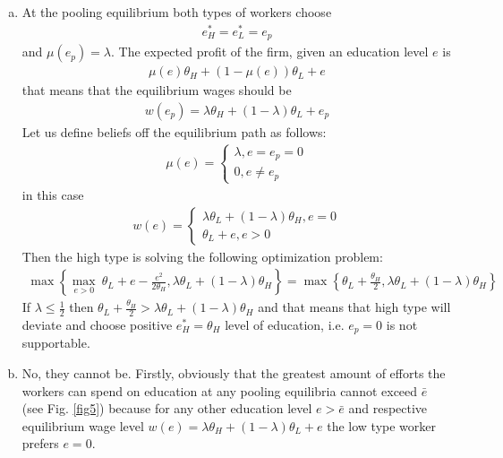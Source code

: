 \documentclass[a4paper]{article}
\begin{document}
\begin{enumerate}
	\begin{enumerate}[(a)]
	\item At the pooling equilibrium both types of workers choose
	\begin{align*}
	e^*_H = e^*_L = e_p
	\end{align*}
	and $\mu(e_p) = \lambda$. The expected profit of the firm, given an education level $e$ is
	\begin{align*}
	\mu(e) \theta_H + (1 - \mu(e)) \theta_L + e
	\end{align*}
	that means that the equilibrium wages should be
	\begin{align*}
	w(e_p) =  \lambda \theta_H + (1 - \lambda) \theta_L + e_p
	\end{align*} 
	Let us define beliefs off the equilibrium path as follows:
	\begin{align*}
	\mu(e) = \begin{cases}
	\lambda, e=e_p = 0\\
	0, e \neq e_p
	\end{cases}
	\end{align*}
	in this case
	\begin{align*}
	w(e) = \begin{cases}
	\lambda \theta_L + (1 - \lambda) \theta_H, e = 0\\
	\theta_L + e, e > 0
	\end{cases}
	\end{align*}
	Then the high type is solving the following optimization problem:
	\begin{align*}
	\max\left\{ \underset{e > 0}{\max}\ \theta_L + e - \frac{e^2}{2\theta_H}, \lambda \theta_L + (1 - \lambda) \theta_H \right\} = \max\left\{\theta_L + \frac{\theta_H}{2}, \lambda \theta_L + (1 - \lambda) \theta_H \right\}
	\end{align*}
	If $\lambda \le \frac{1}{2}$ then $\theta_L + \frac{\theta_H}{2} > \lambda \theta_L + (1 - \lambda)\theta_H$ and that means that high type will deviate and choose positive $e^*_H = \theta_H$ level of education, i.e. $e_p = 0$ is not supportable.
	\item No, they cannot be. Firstly, obviously that the greatest amount of efforts the workers can spend on education at any pooling equilibria cannot exceed $\bar{e}$ (see Fig. \ref{fig5}) because for any other education level $e > \bar{e}$ and respective equilibrium wage level $w(e) = \lambda \theta_H + (1 - \lambda)\theta_L + e$ the low type worker prefers $e = 0$.
	\begin{figure}[H]
		\centering

\end{figure}
\end{enumerate}
\end{enumerate}
\end{document}
